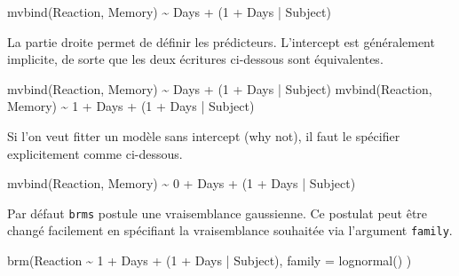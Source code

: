\documentclass[
  a4paper,11pt,twoside,onecolumn,openright,final,oldfontcommands]{memoir}
\newenvironment{Shaded}{\begin{snugshade}}{\end{snugshade}}
\newcommand{\AttributeTok}[1]{\textcolor[rgb]{0.77,0.63,0.00}{#1}}
\newcommand{\DecValTok}[1]{\textcolor[rgb]{0.00,0.00,0.81}{#1}}
\newcommand{\FunctionTok}[1]{\textcolor[rgb]{0.00,0.00,0.00}{#1}}
\newcommand{\NormalTok}[1]{#1}
\newcommand{\SpecialCharTok}[1]{\textcolor[rgb]{0.00,0.00,0.00}{#1}}
\theoremstyle{definition}
\theoremstyle{definition}
\theoremstyle{definition}
\theoremstyle{definition}
\theoremstyle{remark}
\begin{document}
\begin{Shaded}
\begin{Highlighting}[]
\FunctionTok{mvbind}\NormalTok{(Reaction, Memory) }\SpecialCharTok{\textasciitilde{}}\NormalTok{ Days }\SpecialCharTok{+}\NormalTok{ (}\DecValTok{1} \SpecialCharTok{+}\NormalTok{ Days }\SpecialCharTok{|}\NormalTok{ Subject)}
\end{Highlighting}
\end{Shaded}

La partie droite permet de définir les prédicteurs. L'intercept est généralement implicite, de sorte que les deux écritures ci-dessous sont équivalentes.

\begin{Shaded}
\begin{Highlighting}[]
\FunctionTok{mvbind}\NormalTok{(Reaction, Memory) }\SpecialCharTok{\textasciitilde{}}\NormalTok{ Days }\SpecialCharTok{+}\NormalTok{ (}\DecValTok{1} \SpecialCharTok{+}\NormalTok{ Days }\SpecialCharTok{|}\NormalTok{ Subject)}
\FunctionTok{mvbind}\NormalTok{(Reaction, Memory) }\SpecialCharTok{\textasciitilde{}} \DecValTok{1} \SpecialCharTok{+}\NormalTok{ Days }\SpecialCharTok{+}\NormalTok{ (}\DecValTok{1} \SpecialCharTok{+}\NormalTok{ Days }\SpecialCharTok{|}\NormalTok{ Subject)}
\end{Highlighting}
\end{Shaded}

Si l'on veut fitter un modèle sans intercept (why not), il faut le spécifier explicitement comme ci-dessous.

\begin{Shaded}
\begin{Highlighting}[]
\FunctionTok{mvbind}\NormalTok{(Reaction, Memory) }\SpecialCharTok{\textasciitilde{}} \DecValTok{0} \SpecialCharTok{+}\NormalTok{ Days }\SpecialCharTok{+}\NormalTok{ (}\DecValTok{1} \SpecialCharTok{+}\NormalTok{ Days }\SpecialCharTok{|}\NormalTok{ Subject)}
\end{Highlighting}
\end{Shaded}

Par défaut \texttt{brms} postule une vraisemblance gaussienne. Ce postulat peut être changé facilement en spécifiant la vraisemblance souhaitée via l'argument \texttt{family}.

\begin{Shaded}
\begin{Highlighting}[]
\FunctionTok{brm}\NormalTok{(Reaction }\SpecialCharTok{\textasciitilde{}} \DecValTok{1} \SpecialCharTok{+}\NormalTok{ Days }\SpecialCharTok{+}\NormalTok{ (}\DecValTok{1} \SpecialCharTok{+}\NormalTok{ Days }\SpecialCharTok{|}\NormalTok{ Subject), }\AttributeTok{family =} \FunctionTok{lognormal}\NormalTok{() )}
\end{Highlighting}
\end{Shaded}
\end{document}
